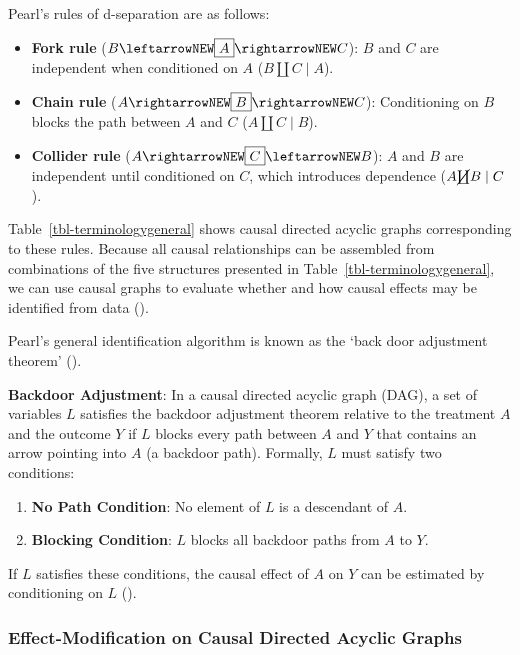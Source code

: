 \documentclass[
  single column]{article}
\providecommand{\tightlist}{%
  \setlength{\itemsep}{0pt}\setlength{\parskip}{0pt}}\usepackage{longtable,booktabs,array}
\begin{document}
Pearl's rules of d-separation are as follows:

\begin{itemize}
\tightlist
\item
  \textbf{Fork rule} (\(B \leftarrowNEW \boxed{A} \rightarrowNEW C\)):
  \(B\) and \(C\) are independent when conditioned on \(A\)
  (\(B \coprod C \mid A\)).
\item
  \textbf{Chain rule} (\(A \rightarrowNEW \boxed{B} \rightarrowNEW C\)):
  Conditioning on \(B\) blocks the path between \(A\) and \(C\)
  (\(A \coprod C \mid B\)).
\item
  \textbf{Collider rule}
  (\(A \rightarrowNEW \boxed{C} \leftarrowNEW B\)): \(A\) and \(B\) are
  independent until conditioned on \(C\), which introduces dependence
  (\(A \cancel{\coprod} B \mid C\)).
\end{itemize}

Table~\ref{tbl-terminologygeneral} shows causal directed acyclic graphs
corresponding to these rules. Because all causal relationships can be
assembled from combinations of the five structures presented in
Table~\ref{tbl-terminologygeneral}, we can use causal graphs to evaluate
whether and how causal effects may be identified from data
().

Pearl's general identification algorithm is known as the `back door
adjustment theorem' ().

\textbf{Backdoor Adjustment}: In a causal directed acyclic graph (DAG),
a set of variables \(L\) satisfies the backdoor adjustment theorem
relative to the treatment \(A\) and the outcome \(Y\) if \(L\) blocks
every path between \(A\) and \(Y\) that contains an arrow pointing into
\(A\) (a backdoor path). Formally, \(L\) must satisfy two conditions:

\begin{enumerate}
\def\labelenumi{\arabic{enumi}.}
\tightlist
\item
  \textbf{No Path Condition}: No element of \(L\) is a descendant of
  \(A\).
\item
  \textbf{Blocking Condition}: \(L\) blocks all backdoor paths from
  \(A\) to \(Y\).
\end{enumerate}

If \(L\) satisfies these conditions, the causal effect of \(A\) on \(Y\)
can be estimated by conditioning on \(\boxed{L}\)
().

\subsubsection{Effect-Modification on Causal Directed Acyclic
Graphs}\label{effect-modification-on-causal-directed-acyclic-graphs}
\end{document}
